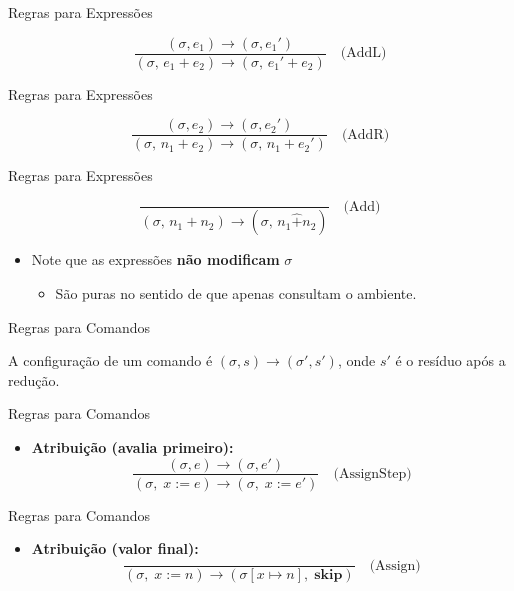 \begin{frame}{Regras para Expressões}

    \[\frac{(\sigma, e_1) \to (\sigma, e_1')}{(\sigma,\, e_1 + e_2) \to (\sigma,\, e_1' + e_2)} \quad\text{(AddL)}
    \]
\end{frame}

\begin{frame}{Regras para Expressões}

    \[
    \frac{(\sigma, e_2) \to (\sigma, e_2')}{(\sigma,\, n_1 + e_2) \to (\sigma,\, n_1 + e_2')} \quad\text{(AddR)}\]
\end{frame}

\begin{frame}{Regras para Expressões}

    \[\frac{}{(\sigma,\, n_1 + n_2) \to (\sigma,\, n_1 \mathbin{\hat{+}} n_2)} \quad\text{(Add)}\]

    \begin{itemize}

        \item
        Note que as expressões \textbf{não modificam} \(\sigma\)

        \begin{itemize}

            \item
            São puras no sentido de que apenas consultam o ambiente.
        \end{itemize}
    \end{itemize}
\end{frame}

\begin{frame}{Regras para Comandos}

    A configuração de um comando é \((\sigma, s) \to (\sigma', s')\), onde
    \(s'\) é o resíduo após a redução.
\end{frame}

\begin{frame}{Regras para Comandos}

    \begin{itemize}

        \item
        \textbf{Atribuição (avalia primeiro):}
        \[\frac{(\sigma, e) \to (\sigma, e')}{(\sigma,\; x \mathbin{:=} e) \to (\sigma,\; x \mathbin{:=} e')} \quad\text{(AssignStep)}\]
    \end{itemize}
\end{frame}

\begin{frame}{Regras para Comandos}

    \begin{itemize}

        \item
        \textbf{Atribuição (valor final):}
        \[\frac{}{(\sigma,\; x \mathbin{:=} n) \to (\sigma[x \mapsto n],\; \mathbf{skip})} \quad\text{(Assign)}\]
    \end{itemize}
\end{frame}

